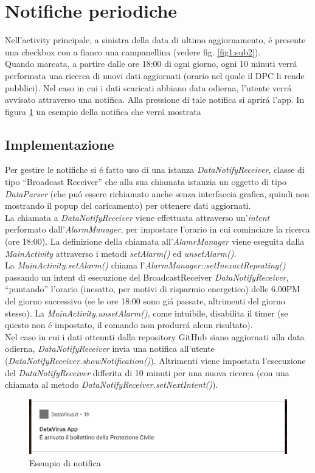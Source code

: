 \documentclass{article}
\newcommand{\quotes}[1]{``#1''}
\begin{document}
    \section{Notifiche periodiche}

    Nell'activity principale, a sinistra della data di ultimo aggiornamento, é presente una checkbox con a fianco una campanellina (vedere fig. \ref{fig1:sub2}).
    \\
    Quando marcata, a partire dalle ore 18:00 di ogni giorno, ogni 10 minuti verrá performata una ricerca di nuovi dati aggiornati (orario nel quale il DPC li rende pubblici).
    Nel caso in cui i dati scaricati abbiano data odierna, l'utente verrá avvisato attraverso una notifica. Alla pressione di tale notifica si aprirá l'app. In figura \ref{fig7} un esempio della notifica che verrá mostrata 

    \subsection{Implementazione}
    
    Per gestire le notifiche si é fatto uso di una istanza \emph{DataNotifyReceiver}, classe di tipo \quotes{Broadcast Receiver}
    che alla sua chiamata istanzia un oggetto di tipo \emph{DataParser} (che puó essere richiamato anche senza interfaccia grafica, quindi non mostrando il popup del caricamento) per ottenere dati aggiornati.
    \\
    La chiamata a \emph{DataNotifyReceiver} viene effettuata attraverso un'\emph{intent} performato dall'\emph{AlarmManager}, per impostare l'orario in cui cominciare la ricerca (ore 18:00). 
    La definizione della chiamata all'\emph{AlamrManager} viene eseguita dalla \emph{MainActivity} attraverso i metodi \emph{setAlarm()} ed \emph{unsetAlarm()}.
    \\
    La \emph{MainActivity.setAlarm()} chiama l'\emph{AlarmManager::setInexactRepeating()} passando un intent di esecuzione del BroadcastReceiver \emph{DataNotifyReceiver}, \quotes{puntando} l'orario (inesatto, per motivi di risparmio energetico) delle 6.00PM del giorno successivo 
    (se le ore 18:00 sono giá passate, altrimenti del giorno stesso). 
    La \emph{MainActivity.unsetAlarm()}, come intuibile, disabilita il timer (se questo non é impostato, il comando non produrrá alcun risultato).
    \\
    Nel caso in cui i dati ottenuti dalla repository GitHub siano aggiornati alla data odierna, \emph{DataNotifyReceiver} invia una notifica all'utente (\emph{DataNotifyReceiver.showNotification()}).
    Altrimenti viene impostata l'esecuzione del \emph{DataNotifyReceiver} differita di 10 minuti per una nuova ricerca (con una chiamata al metodo \emph{DataNotifyReceiver.setNextIntent()}).

    \begin{figure}[h]
      \centering
      \includegraphics[width=.9\linewidth]{notif.jpg}
      \caption{Esempio di notifica}
      \label{fig7}
    \end{figure}
\end{document}
